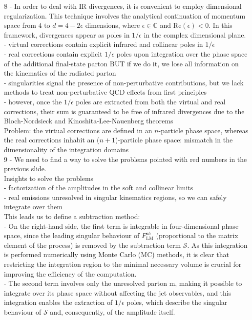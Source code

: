 \documentclass{article}
\begin{document}
8 - In order to deal with IR divergences, it is convenient to employ dimensional regularization. This technique involves the analytical continuation of momentum space from $4$ to $d=4-2\epsilon$ dimensions, where $\epsilon \in \mathbb{C}$ and $\mathrm{Re}(\epsilon)<0$. In this framework, divergences appear as poles in $1/\epsilon$ in the complex dimensional plane. \\
- virtual corrections contain explicit infrared and collinear poles in $1/\epsilon$ \\
- real corrections contain explicit $1/\epsilon$ poles upon integration over the phase space of the additional final-state parton BUT if we do it, we lose all information on the kinematics of the radiated parton \\
- singularities signal the presence of non-perturbative contributions, but we lack methods to treat non-perturbative QCD effects from first principles \\
- however, once the $1/\epsilon$ poles are extracted from both the virtual and real corrections, their sum is guaranteed to be free of infrared divergences due to the Bloch-Nordsieck and Kinoshita-Lee-Nauenberg theorems \\
Problem: the virtual corrections are defined in an $n$-particle phase space, whereas the real corrections inhabit an ($n+1$)-particle phase space: mismatch in the dimensionality of the integration domains \\

9 - We need to find a way to solve the problems pointed with red numbers in the previous slide. \\
Insights to solve the problems \\
- factorization of the amplitudes in the soft and collinear limits  \\
- real emissions unresolved in singular kinematics regions, so we can safely integrate over them \\
This leads us to define a subtraction method: \\
- On the right-hand side, the first term is integrable in four-dimensional phase space, since the leading singular behaviour of $F^{ab}_{\mathrm{LM}}$ (proportional to the matrix element of the process) is removed by the subtraction term $\mathcal{S}$. As this integration is performed numerically using Monte Carlo (MC) methods, it is clear that restricting the integration region to the minimal necessary volume is crucial for improving the efficiency of the computation.\\
- The second term involves only the unresolved parton m, making it possible to integrate over its phase space without affecting the jet observables, and this integration enables the extraction of $1/\epsilon$ poles, which describe the singular behaviour of $\mathcal{S}$ and, consequently, of the amplitude itself. 
\end{document}
